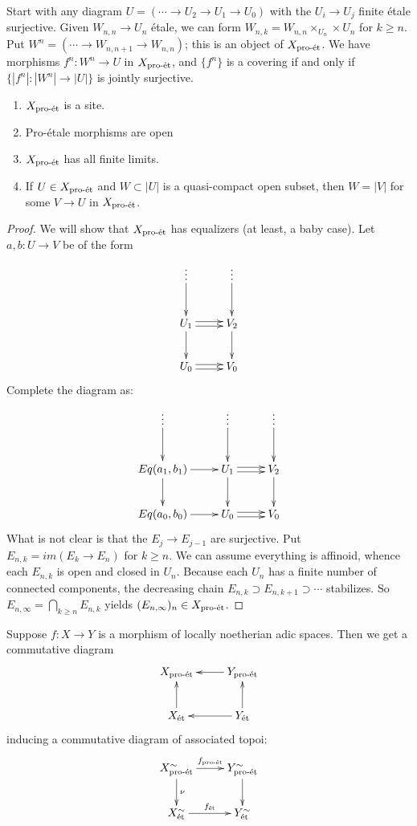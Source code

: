 \begin{example}
Start with any diagram $U=(\cdots \to U_2 \to U_1 \to U_0)$ with the $U_i \to U_j$ finite 
\'etale surjective. Given $W_{n,n} \to U_n$ \'etale, we can form 
$W_{n,k} = W_{n,n}\times_{U_n}\times U_n$ for $k\geqslant n$. 
Put $W^n=(\cdots \to W_{n,n+1} \to W_{n,n})$; this is an object of $X_{\textnormal{pro-\'et}}$.
We have morphisms $f^n:W^n\to U$ in $X_{\textnormal{pro-\'et}}$, and $\{f^n\}$ is a covering 
if and only if $\{|f^n|:|W^n| \to |U|\}$ is jointly surjective.  
\end{example}

\begin{lemma}
\begin{enumerate}
  \item $X_{\textnormal{pro-\'et}}$ is a site. 
  \item Pro-\'etale morphisms are open
  \item $X_{\textnormal{pro-\'et}}$ has all finite limits. 
  \item If $U\in X_{\textnormal{pro-\'et}}$ and $W\subset |U|$ is a quasi-compact open subset, then 
    $W=|V|$ for some $V\to U$ in $X_{\textnormal{pro-\'et}}$. 
\end{enumerate}
\end{lemma}
\begin{proof}
We will show that $X_{\textnormal{pro-\'et}}$ has equalizers (at least, a baby case). 
Let $a,b:U\to V$ be of the form 
\[\xymatrix{
  \vdots \ar[d] 
    & \vdots \ar[d] \\
  U_1 \ar[d] \ar@<2pt>[r] \ar@<-2pt>[r] 
    & V_2 \ar[d] \\
  U_0 \ar@<2pt>[r] \ar@<-2pt>[r] 
    & V_0
}\]
Complete the diagram as: 
\[\xymatrix{
    \vdots \ar[d] 
    & \vdots \ar[d] 
    & \vdots \ar[d] \\
  Eq(a_1,b_1) \ar[r] \ar[d] 
    & U_1 \ar[d] \ar@<2pt>[r] \ar@<-2pt>[r] 
    & V_2 \ar[d] \\
  Eq(a_0,b_0) \ar[r] 
    & U_0 \ar@<2pt>[r] \ar@<-2pt>[r] 
    & V_0
}\]
What is not clear is that the $E_j \to E_{j-1}$ are surjective. Put 
$E_{n,k}=im(E_k \to E_n)$ for $k\geqslant n$. We can assume everything 
is affinoid, whence each $E_{n,k}$ is open and closed in $U_n$. Because 
each $U_n$ has a finite number of connected components, the decreasing 
chain $E_{n,k}\supset E_{n,k+1}\supset \cdots$ stabilizes. So 
$E_{n,\infty} = \bigcap_{k\geqslant n} E_{n,k}$ yields 
$(E_{n,\infty})_n \in X_{\textnormal{pro-\'et}}$. 
\end{proof}

Suppose $f:X\to Y$ is a morphism of locally noetherian adic spaces. Then we get 
a commutative diagram 
\[\xymatrix{
  X_\proet 
    & Y_\proet \ar[l] \\
  X_\et \ar[u] 
    & Y_\et \ar[l] \ar[u] 
}\]
inducing a commutative diagram of associated topoi:
\[\xymatrix{
  X_\proet^\sim \ar[r]^-{f_\proet} \ar[d]^-\nu  
    & Y_\proet^\sim \ar[d] \\
  X_\et^\sim \ar[r]^-{f_\et} 
    & Y_\et^\sim 
}\]

